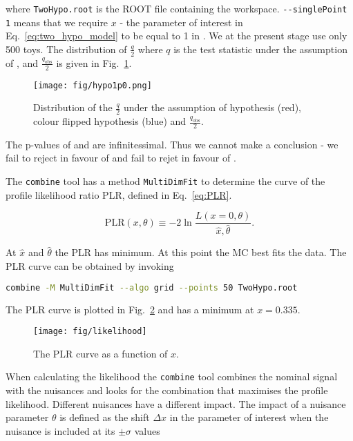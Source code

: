 \noindent where \lstinline[language=sh]|TwoHypo.root| is the ROOT file containing the workspace. \lstinline[language=sh]|--singlePoint 1| means that we require $x$ - the parameter of interest in Eq.~\ref{eq:two_hypo_model} to be equal to 1 in \Halt. We at the present stage use only 500 toys. The distribution of $\frac{q}{2}$ where $q$ is the test statistic under the assumption of \Hnull, \Halt and $\frac{q_{\text{obs}}}{2}$ is given in Fig.~\ref{fig:hypo1p0}.

\begin{figure}
  \centering
  \texttt{[image: fig/hypo1p0.png]}
  \caption{Distribution of the $\frac{q}{2}$ under the assumption of \ttbar hypothesis (red), colour flipped \ttbar hypothesis (blue) and $\frac{q_{\text{obs}}}{2}$.}
  \label{fig:hypo1p0}
\end{figure}

The p-values of \Halt and \Hnull are infinitessimal. Thus we cannot make a conclusion - we fail to reject \Hnull in favour of \Halt and fail to rejet \Halt in favour of \Hnull.

The \lstinline[language=sh]|combine| tool has a method \lstinline[language=sh]|MultiDimFit| to determine the curve of the profile likelihood ratio PLR, defined in Eq.~\ref{eq:PLR}.

\begin{equation}
  \text{PLR}(x, \theta)\equiv-2\ln\frac{L(x=0, \theta)}{\hat{x}, \hat{\theta}}.
  \label{eq:PLR}              
\end{equation}

At $\hat{x}$ and $\hat{\theta}$ the PLR has minimum. At this point the MC best fits the data. The PLR curve can be obtained by invoking

\begin{lstlisting}[language=sh, breaklines=true]
combine -M MultiDimFit --algo grid --points 50 TwoHypo.root
\end{lstlisting}

The PLR curve is plotted in Fig.~\ref{fig:likelihood} and has a minimum at $x=0.335$.

\begin{figure}
  \centering
  \texttt{[image: fig/likelihood]}
  \caption{The PLR curve as a function of $x$.}
  \label{fig:likelihood}
\end{figure}

When calculating the likelihood the \lstinline[language=sh]|combine| tool combines the nominal signal with the nuisances and looks for the combination that maximises the profile likelihood. Different nuisances have a different impact. The impact of a nuisance parameter $\theta$ is defined as the shift $\Delta x$ in the parameter of interest when the nuisance is included at its $\pm\sigma$ values

